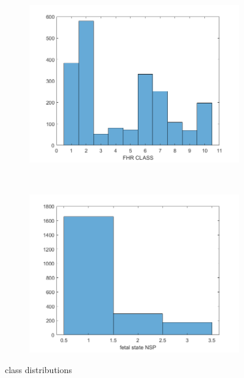 \documentclass[11pt,a4paper]{article}
\begin{document}
\begin{figure}[htb]
  \centering
  \begin{subfigure}[b]{0.45\textwidth}
    \centering
    \includegraphics[width=\textwidth]{figures/CLASS_HIST.png}
  \end{subfigure}
  ~
  \begin{subfigure}[b]{0.45\textwidth}
    \centering
    \includegraphics[width=\textwidth]{figures/NSP_HIST.png}
  \end{subfigure}
  \caption{class distributions}
  \label{fig:ClassHistograms}
\end{figure}
\end{document}
